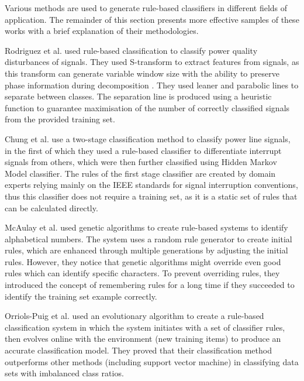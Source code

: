 Various methods are used to generate rule-based classifiers in different fields of application. The remainder of this section presents more effective samples of these works with a brief explanation of their methodologies.

Rodriguez et al. \cite{Rodriguez2012} used rule-based classification to classify power quality disturbances of signals. They used S-transform to extract features from signals, as this transform can generate variable window size with the ability to preserve phase information during decomposition \cite{Chen1996}. They used leaner and parabolic lines to separate between classes. The separation line is produced using a heuristic function to guarantee maximisation of the number of correctly classified signals from the provided training set.

Chung et al. \cite{Chung2002} use a two-stage classification method to classify power line signals, in the first of which they used a rule-based classifier to differentiate interrupt signals from others, which were then further classified using Hidden Markov Model classifier. The rules of the first stage classifier are created by domain experts relying mainly on the IEEE standards for signal interruption conventions, thus this classifier does not require a training set, as it is a static set of rules that can be calculated directly.

McAulay et al. \cite{McAulay1994} used genetic algorithms to create rule-based systems to identify alphabetical numbers. The system uses a random rule generator to create initial rules, which are enhanced through multiple generations by adjusting the initial rules. However, they notice that genetic algorithms might override even good rules which can identify specific characters. To prevent overriding rules, they introduced the concept of remembering rules for a long time if they succeeded to identify the training set example correctly.

Orriols-Puig et al. \cite{Orriols-Puig2009} used an evolutionary algorithm to create a rule-based classification system in which the system initiates with a set of classifier rules, then evolves online with the environment (new training items) to produce an accurate classification model. They proved that their classification method outperforms other methods (including support vector machine) in classifying data sets with imbalanced class ratios.

